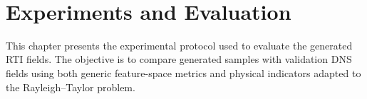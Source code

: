 
﻿\chapter{Experiments and Evaluation}
\label{chap:experiments}

This chapter presents the experimental protocol used to evaluate the generated RTI fields. The objective is to compare generated samples with validation DNS fields using both generic feature-space metrics and physical indicators adapted to the Rayleigh--Taylor problem.







